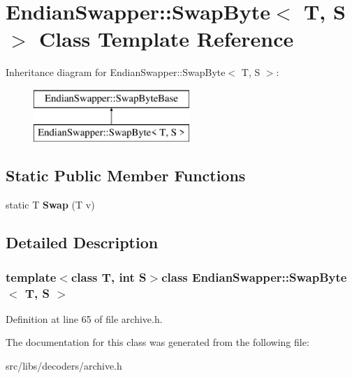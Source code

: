 \hypertarget{classEndianSwapper_1_1SwapByte}{\section{Endian\-Swapper\-:\-:Swap\-Byte$<$ T, S $>$ Class Template Reference}
\label{classEndianSwapper_1_1SwapByte}
}
Inheritance diagram for Endian\-Swapper\-:\-:Swap\-Byte$<$ T, S $>$\-:\begin{figure}[H]
\begin{center}
\leavevmode
\includegraphics[height=2.000000cm]{classEndianSwapper_1_1SwapByte}
\end{center}
\end{figure}
\subsection*{Static Public Member Functions}
\begin{DoxyCompactItemize}
\item 
\hypertarget{classEndianSwapper_1_1SwapByte_a8d4be2d38909e8cb9d351368694d85bd}{static T {\bfseries Swap} (T v)}\label{classEndianSwapper_1_1SwapByte_a8d4be2d38909e8cb9d351368694d85bd}

\end{DoxyCompactItemize}


\subsection{Detailed Description}
\subsubsection*{template$<$class T, int S$>$class Endian\-Swapper\-::\-Swap\-Byte$<$ T, S $>$}



Definition at line 65 of file archive.\-h.



The documentation for this class was generated from the following file\-:\begin{DoxyCompactItemize}
\item 
src/libs/decoders/archive.\-h\end{DoxyCompactItemize}
